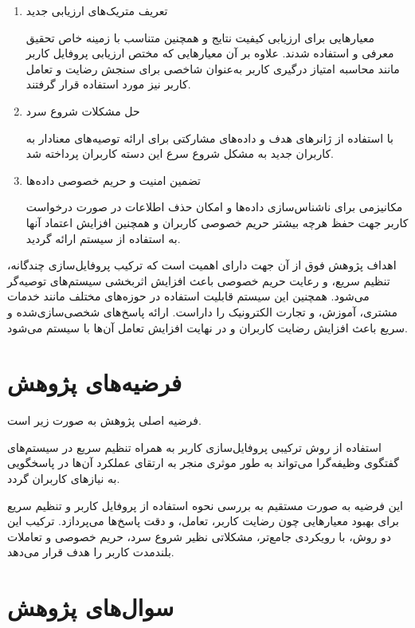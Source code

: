 \begin{itemize}
\begin{enumerate}
\item
تعریف متریک‌های ارزیابی جدید

معیار‌هایی برای ارزیابی کیفیت نتایج و همچنین متناسب با زمینه خاص تحقیق معرفی و استفاده شدند. علاوه بر آن معیارهایی که مختص ارزیابی پروفایل کاربر مانند محاسبه امتیاز درگیری کاربر به‌عنوان شاخصی برای سنجش رضایت و تعامل کاربر نیز مورد استفاده قرار گرفتند.

\item
حل مشکلات شروع سرد

با استفاده از ژانرهای هدف و داده‌های مشارکتی برای ارائه توصیه‌های معنادار به کاربران جدید به مشکل شروع سرع این دسته کاربران پرداخته شد.

\item
تضمین امنیت و حریم خصوصی داده‌ها

مکانیزمی برای ناشناس‌سازی داده‌ها و امکان حذف اطلاعات در صورت درخواست کاربر جهت حفظ هرچه بیشتر حریم خصوصی کاربران و همچنین افزایش اعتماد آنها به استفاده از سیستم ارائه گردید.

\end{enumerate}

\end{itemize}

اهداف پژوهش فوق از آن جهت دارای اهمیت است که ترکیب پروفایل‌سازی چندگانه، تنظیم سریع، و رعایت حریم خصوصی باعث افزایش اثربخشی سیستم‌های توصیه‌گر می‌شود. همچنین این سیستم قابلیت استفاده در حوزه‌های مختلف مانند خدمات مشتری، آموزش، و تجارت الکترونیک را داراست. ارائه پاسخ‌های شخصی‌سازی‌شده و سریع باعث افزایش رضایت کاربران و در نهایت افزایش تعامل آن‌ها با سیستم می‌شود.


\section{فرضیه‌های پژوهش}


فرضیه اصلی پژوهش به صورت زیر است.

استفاده از روش ترکیبی پروفایل‌سازی کاربر به همراه تنظیم سریع در سیستم‌های گفتگوی وظیفه‌گرا می‌تواند به طور موثری منجر به ارتقای عملکرد آن‌ها در پاسخگویی به نیازهای کاربران گردد.

این فرضیه به صورت مستقیم به بررسی نحوه استفاده از پروفایل کاربر و تنظیم سریع برای بهبود معیارهایی چون رضایت کاربر، تعامل، و دقت پاسخ‌ها می‌پردازد. ترکیب این دو روش، با رویکردی جامع‌تر، مشکلاتی نظیر شروع سرد، حریم خصوصی و تعاملات بلندمدت کاربر را هدف قرار می‌دهد.


\section{سوال‌های پژوهش}

